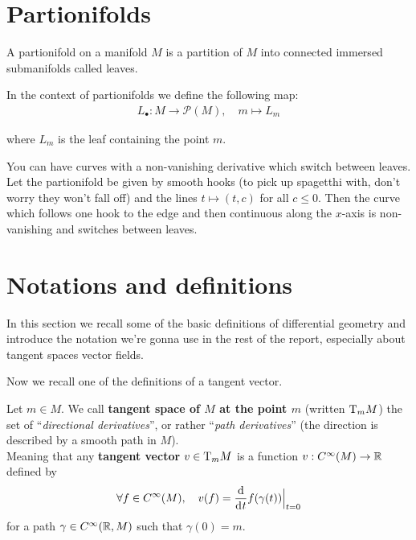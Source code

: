 




	\section{Partionifolds}
		A partionifold on a manifold $M$ is a partition of $M$ into connected immersed submanifolds called leaves. \bigskip

		In the context of partionifolds we define the following map:
%
		\begin{align*}
			L_\bullet : M \to \mathcal{P}(M), \quad m \mapsto L_m
		\end{align*}

		where $L_m$ is the leaf containing the point $m$. \bigskip

		You can have curves with a non-vanishing derivative which switch between leaves. Let the partionifold be given by smooth hooks (to pick up spagetthi with, don't worry they won't fall off) and the lines $t \mapsto (t, c)$ for all $c \leq 0$. Then the curve which follows one hook to the edge and then continuous along the $x$-axis is non-vanishing and switches between leaves.

\newpage

\section{Notations and definitions}

	In this section we recall some of the basic definitions of differential geometry and introduce the notation we're gonna use in the rest of the report, especially about tangent spaces vector fields.


	Now we recall one of the definitions of a tangent vector.

	\begin{definition}
		Let $m \in M$.
		We call \textbf{tangent space of $M$ at the point $m$} (written $\mathrm{T}_m{M}$) the set of ``\emph{directional derivatives}'', or rather ``\emph{path derivatives}'' (the direction is described by a smooth path in $M$). \\
		Meaning that any \textbf{tangent vector} $v \in \mathrm{T}_m{M}$ is a function $v: C^\infty(M) \to \mathbb{R}$ defined by
		$$
			\forall f \in \Cinf(M), \quad v(f) = \frac{\d}{\di{t}} f(\gamma(t)) \Big|_{t=0}
		$$
		for a path $\gamma \in C^\infty(\mathbb{R}, M)$ such that $\gamma(0) = m$.
	\end{definition}

